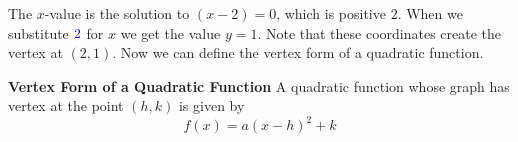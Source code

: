 \documentclass{ximera}
\begin{document}
      The $x$-value is the solution to $(x-2)=0$,
      which is positive $2$.
      When we substitute ${\color{blue}{{2}}}$ for $x$ we get the value $y=1$.
      Note that these coordinates create the vertex at $(2,1)$.
      Now we can define the vertex form of a quadratic function.

\begin{callout} \textbf{\large{Vertex Form of a Quadratic Function}}
          A quadratic function whose graph has vertex at the point $(h,k)$ is given by
\[
f(x)=a(x-h)^2+k
\]
\end{callout}

   

%
\end{document}
